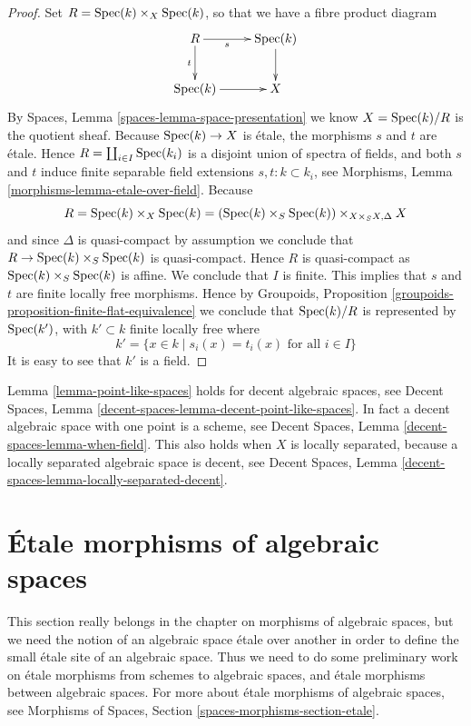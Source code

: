\begin{proof}
Set $R = \mathop{\mathrm{Spec}}(k) \times_X \mathop{\mathrm{Spec}}(k)$, so that we have a
fibre product diagram
$$
\xymatrix{
R \ar[r]_-s \ar[d]_-t & \Spec(k) \ar[d] \\
\Spec(k) \ar[r] & X
}
$$
By
Spaces, Lemma \ref{spaces-lemma-space-presentation}
we know $X = \mathop{\mathrm{Spec}}(k)/R$ is the quotient sheaf.
Because $\mathop{\mathrm{Spec}}(k) \to X$ is \'etale, the morphisms $s$ and $t$ are
\'etale. Hence $R = \coprod_{i \in I} \mathop{\mathrm{Spec}}(k_i)$ is a disjoint
union of spectra of fields, and both $s$ and $t$
induce finite separable field extensions $s, t : k \subset k_i$, see
Morphisms, Lemma \ref{morphisms-lemma-etale-over-field}.
Because
$$
R = \mathop{\mathrm{Spec}}(k) \times_X \mathop{\mathrm{Spec}}(k)
= (\mathop{\mathrm{Spec}}(k) \times_S \mathop{\mathrm{Spec}}(k)) \times_{X \times_S X, \Delta} X
$$
and since $\Delta$ is quasi-compact by assumption we conclude that
$R \to \mathop{\mathrm{Spec}}(k) \times_S \mathop{\mathrm{Spec}}(k)$ is quasi-compact.
Hence $R$ is quasi-compact as $\mathop{\mathrm{Spec}}(k) \times_S \mathop{\mathrm{Spec}}(k)$ is
affine. We conclude that $I$ is finite. This implies
that $s$ and $t$ are finite locally free morphisms. Hence by
Groupoids, Proposition \ref{groupoids-proposition-finite-flat-equivalence}
we conclude that $\mathop{\mathrm{Spec}}(k)/R$ is
represented by $\mathop{\mathrm{Spec}}(k')$, with $k' \subset k$ finite locally free
where
$$
k' = \{x \in k \mid s_i(x) = t_i(x)\text{ for all }i \in I\}
$$
It is easy to see that $k'$ is a field.
\end{proof}

\begin{remark}
\label{remark-cannot-decide-yet}
Lemma \ref{lemma-point-like-spaces} holds for decent algebraic spaces, see
Decent Spaces, Lemma \ref{decent-spaces-lemma-decent-point-like-spaces}.
In fact a decent algebraic space with one point is a scheme, see
Decent Spaces, Lemma \ref{decent-spaces-lemma-when-field}.
This also holds when $X$ is locally separated, because a
locally separated algebraic space is decent, see
Decent Spaces, Lemma \ref{decent-spaces-lemma-locally-separated-decent}.
\end{remark}







\section{\'Etale morphisms of algebraic spaces}
\label{section-etale-morphisms}

\noindent
This section really belongs in the chapter on morphisms of algebraic
spaces, but we need the notion of an algebraic space \'etale over another
in order to define the small \'etale site of an algebraic space.
Thus we need to do some preliminary work on \'etale morphisms from schemes to
algebraic spaces, and \'etale morphisms between algebraic spaces.
For more about \'etale morphisms of algebraic spaces, see
Morphisms of Spaces, Section \ref{spaces-morphisms-section-etale}.


